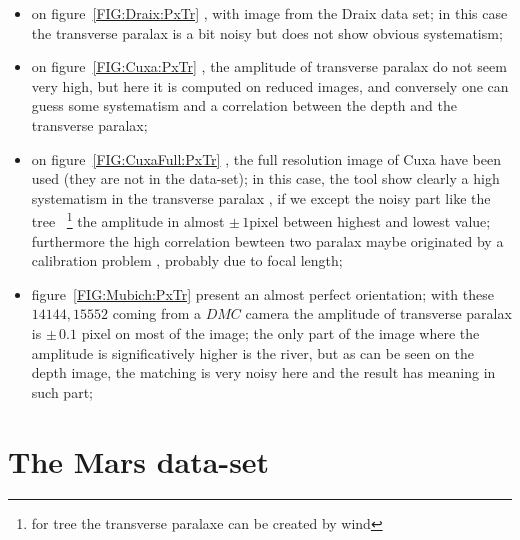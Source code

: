 \begin{itemize}
   \item on figure~\ref{FIG:Draix:PxTr} , with image from the Draix data set; in this case
          the transverse paralax is a bit noisy but does not show  obvious systematism;

   \item on figure~\ref{FIG:Cuxa:PxTr} , the amplitude of transverse paralax do not seem
         very high, but here it is computed on reduced images, and conversely one can guess
         some systematism and a correlation between the depth and the transverse paralax;

   \item on figure~\ref{FIG:CuxaFull:PxTr} ,  the full resolution image of Cuxa  have been 
         used (they are not in the data-set); in this case, the tool show clearly a high systematism in
         the transverse paralax  , if we except the noisy part like the tree ~\footnote{for tree the
         transverse paralaxe can be created by wind} the amplitude in almost $\pm\,1$pixel
         between highest and lowest value; furthermore the high correlation bewteen two paralax
         maybe originated by a calibration problem , probably due to focal length;

   \item figure~\ref{FIG:Mubich:PxTr} present an almost perfect orientation; with these $14144,15552$
         coming from a $DMC$ camera the amplitude of transverse paralax is $\pm\, 0.1$ pixel on most
         of the image; the only part of the image where the amplitude is significatively higher is
         the river, but as can be seen on the depth image, the matching is very noisy here and the 
         result has meaning in such part;

\end{itemize}




\section{The Mars data-set}

\label{Mars}



